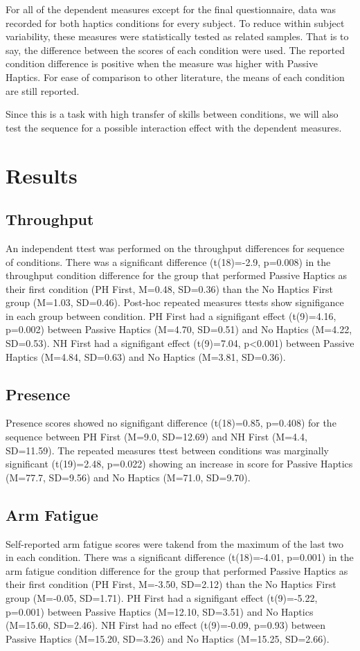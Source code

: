 For all of the dependent measures except for the final questionnaire, data was recorded for both haptics conditions for every subject.
To reduce within subject variability, these measures were statistically tested as related samples.
That is to say, the difference between the scores of each condition were used.
The reported condition difference is positive when the measure was higher with Passive Haptics.
For ease of comparison to other literature, the means of each condition are still reported.

Since this is a task with high transfer of skills between conditions, we will also test the sequence for a possible interaction effect with the dependent measures.


\section{Results}

\subsection{Throughput}

An independent ttest was performed on the throughput differences for sequence of conditions.
There was a significant difference (t(18)=-2.9, p=0.008) in the throughput condition difference for the group that performed Passive Haptics as their first condition (PH First, M=0.48, SD=0.36) than the No Haptics First group (M=1.03, SD=0.46).
Post-hoc repeated measures ttests show signifigance in each group between condition.
PH First had a signifigant effect (t(9)=4.16, p=0.002) between Passive Haptics (M=4.70, SD=0.51) and No Haptics (M=4.22, SD=0.53).
NH First had a signifigant effect (t(9)=7.04, p<0.001) between Passive Haptics (M=4.84, SD=0.63) and No Haptics (M=3.81, SD=0.36).

\subsection{Presence}
Presence scores showed no signifigant difference (t(18)=0.85, p=0.408) for the sequence between PH First (M=9.0, SD=12.69) and NH First (M=4.4, SD=11.59).
The repeated measures ttest between conditions was marginally significant (t(19)=2.48, p=0.022) showing an increase in score for Passive Haptics (M=77.7, SD=9.56) and No Haptics (M=71.0, SD=9.70).

\subsection{Arm Fatigue}
Self-reported arm fatigue scores were takend from the maximum of the last two in each condition.
There was a significant difference (t(18)=-4.01, p=0.001) in the arm fatigue condition difference for the group that performed Passive Haptics as their first condition (PH First, M=-3.50, SD=2.12) than the No Haptics First group (M=-0.05, SD=1.71).
PH First had a signifigant effect (t(9)=-5.22, p=0.001) between Passive Haptics (M=12.10, SD=3.51) and No Haptics (M=15.60, SD=2.46).
NH First had no effect (t(9)=-0.09, p=0.93) between Passive Haptics (M=15.20, SD=3.26) and No Haptics (M=15.25, SD=2.66).

